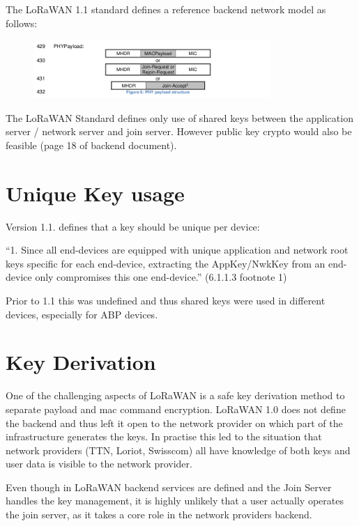 {{The LoRaWAN 1.1 standard defines a reference backend network model as
follows:}
\begin{figure}[h!]
{\includegraphics[width=0.8\textwidth]{images/image10.png}}
\end{figure}

{The LoRaWAN Standard defines only use of shared keys between the
application server / network server and join server. However public key
crypto would also be feasible (page 18 of backend document).}

\hypertarget{h.rxbla8bfpdr7}{\section{\texorpdfstring{{Unique Key
usage}}{Unique Key usage}}\label{h.rxbla8bfpdr7}}

{Version 1.1. defines that a key should be unique per device: }

{``1. Since all end-devices are equipped with unique application and
network root keys specific for each end-device, extracting the
AppKey/NwkKey from an end-device only compromises this one end-device.''
(6.1.1.3 footnote 1)}

{Prior to 1.1 this was undefined and thus shared keys were used in
different devices, especially for ABP devices.}

\hypertarget{h.ukt1jzew31xa}{\section{\texorpdfstring{{Key
Derivation}}{Key Derivation}}\label{h.ukt1jzew31xa}}

{One of the challenging aspects of LoRaWAN is a safe key derivation
method to separate payload and mac command encryption. LoRaWAN 1.0 does
not define the backend and thus left it open to the network provider on
which part of the infrastructure generates the keys. In practise this
led to the situation that network providers (TTN, Loriot, Swisscom) all
have knowledge of both keys and user data is visible to the network
provider.}

{Even though in LoRaWAN backend services are defined and the Join Server
handles the key management, it is highly unlikely that a user actually
operates the join server, as it takes a core role in the network
providers backend. }

}
